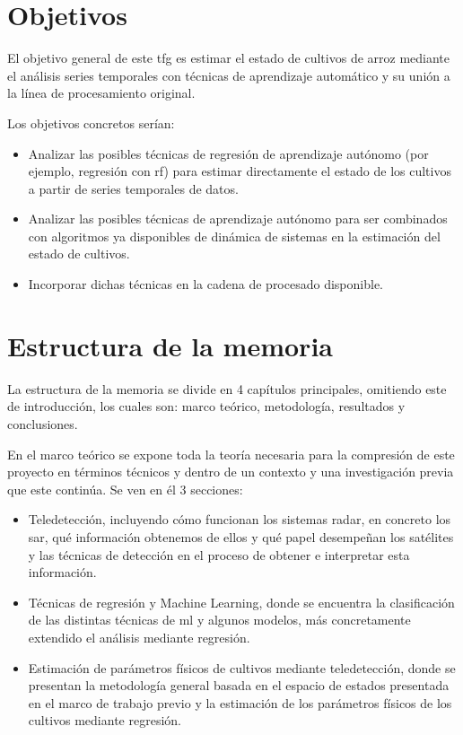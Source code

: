 \section{Objetivos}
El objetivo general de este \gls{tfg} es estimar el estado de cultivos de arroz mediante el análisis series temporales con técnicas de aprendizaje automático y su unión a la línea de procesamiento original.
\\
\par Los objetivos concretos serían: 
\begin{itemize}
	\item Analizar las posibles técnicas de regresión de aprendizaje autónomo (por ejemplo, regresión con \gls{rf}) para estimar directamente el estado de los cultivos a partir de series temporales de datos. 
	\item Analizar las posibles técnicas de aprendizaje autónomo para ser combinados con algoritmos ya disponibles de dinámica de sistemas en la estimación del estado de cultivos.
	\item Incorporar dichas técnicas en la cadena de procesado disponible.
\end{itemize}

\section{Estructura de la memoria}
\par La estructura de la memoria se divide en 4 capítulos principales, omitiendo este de introducción, los cuales son: marco teórico, metodología, resultados y conclusiones. 
\\
\par En el marco teórico se expone toda la teoría necesaria para la compresión de este proyecto en términos técnicos y dentro de un contexto y una investigación previa que este continúa. Se ven en él 3 secciones:
\begin{itemize}
	\item Teledetección, incluyendo cómo funcionan los sistemas radar, en concreto los \gls{sar}, qué información obtenemos de ellos y qué papel desempeñan los satélites y las técnicas de detección en el proceso de obtener e interpretar esta información.
	\item Técnicas de regresión y Machine Learning, donde se encuentra la clasificación de las distintas técnicas de \gls{ml} y algunos modelos, más concretamente extendido el análisis mediante regresión. 
	\item Estimación de parámetros físicos de cultivos mediante
teledetección, donde se presentan la metodología general basada en el espacio de estados presentada en el marco de trabajo previo y la estimación de los parámetros físicos de los cultivos mediante regresión. 
\end{itemize}

